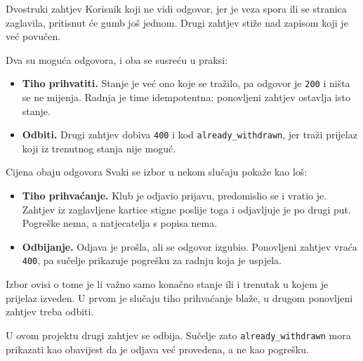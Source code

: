 \begin{frame}{Dvostruki zahtjev}
Korisnik koji ne vidi odgovor, jer je veza spora ili se stranica zaglavila, pritisnut će gumb još jednom. Drugi zahtjev stiže nad zapisom koji je već povučen.

\vspace{0.6em}
Dva su moguća odgovora, i oba se susreću u praksi:

\begin{itemize}
  \item \textbf{Tiho prihvatiti.} Stanje je već ono koje se tražilo, pa odgovor je \texttt{200} i ništa se ne mijenja. Radnja je time idempotentna: ponovljeni zahtjev ostavlja isto stanje.
  \item \textbf{Odbiti.} Drugi zahtjev dobiva \texttt{400} i kod \texttt{already\_withdrawn}, jer traži prijelaz koji iz trenutnog stanja nije moguć.
\end{itemize}

\end{frame}

\begin{frame}{Cijena obaju odgovora}
Svaki se izbor u nekom slučaju pokaže kao loš:

\vspace{0.4em}
\begin{itemize}
  \itemsep0.4em
  \item \textbf{Tiho prihvaćanje.} Klub je odjavio prijavu, predomislio se i vratio je. Zahtjev iz zaglavljene kartice stigne poslije toga i odjavljuje je po drugi put. Pogreške nema, a natjecatelja s popisa nema.
  \item \textbf{Odbijanje.} Odjava je prošla, ali se odgovor izgubio. Ponovljeni zahtjev vraća \texttt{400}, pa sučelje prikazuje pogrešku za radnju koja je uspjela.
\end{itemize}

\vspace{0.4em}
Izbor ovisi o tome je li važno samo konačno stanje ili i trenutak u kojem je prijelaz izveden. U prvom je slučaju tiho prihvaćanje blaže, u drugom ponovljeni zahtjev treba odbiti.

\vspace{0.4em}
\begin{konvencija}
U ovom projektu drugi zahtjev se odbija. Sučelje zato \texttt{already\_withdrawn} mora prikazati kao obavijest da je odjava već provedena, a ne kao pogrešku.
\end{konvencija}
\end{frame}

